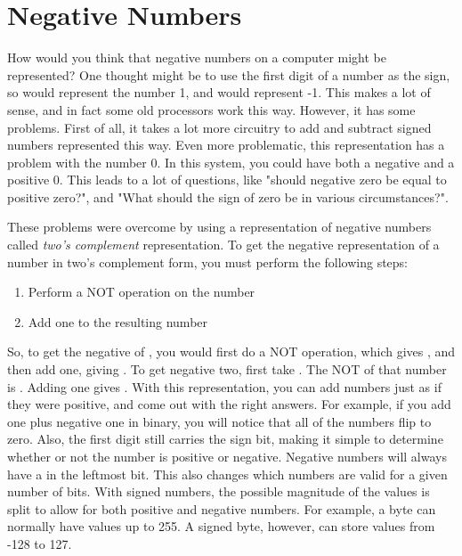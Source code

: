 % 

% 

\section{Negative Numbers}

How would you think that negative numbers on a computer might be represented?
One thought might be to use the first digit of a number
as the sign, so  would
represent the number 1, and 
would represent -1.  This makes a lot of sense, and in fact some old processors
work this way.  However, it has some problems.  First of all, it takes a lot
more circuitry to add and subtract signed numbers represented this way.  
Even more problematic, this 
representation has a problem with the number 0.  In
this system, you could have both a negative and a positive 0.  This leads
to a lot of questions, like "should negative zero be equal to positive zero?",
and "What should the sign of zero be in various circumstances?".  

These problems were overcome by using a representation of negative
numbers called
\emph{two's complement} representation.  To get the negative
representation of a number in two's complement form, you must perform the
following steps:

\begin{enumerate}\item Perform a NOT operation on the number 
\item Add one to the resulting number 
\end{enumerate}

So, to get the negative of ,
you would first do a NOT operation, which gives 
, and then add one, giving
.  To get negative two,
first take .  The NOT
of that number is .  Adding
one gives .  With this
representation, you can add numbers just as if they were positive, and
come out with the right answers.  For example, if you add one plus negative
one in binary, you will notice that all of the numbers flip to zero.  Also,
the first digit still carries the sign bit, making it simple to determine
whether or not the number is positive or negative.
Negative numbers will always have a  in the leftmost 
bit.  This also changes which numbers are valid for a given number of bits.
With signed numbers, the possible magnitude of the values is split to allow
for both positive and negative numbers.  For example, a byte can normally have
values up to 255.  A signed byte, however, can store values from -128 to 127.

